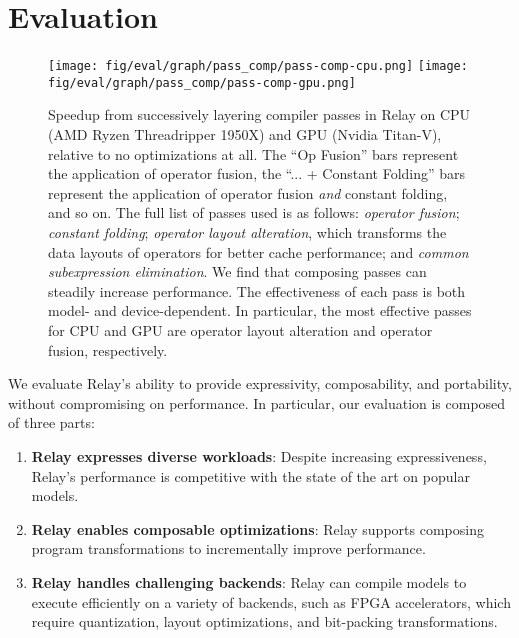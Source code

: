 \section{Evaluation}
\label{sec:eval}

\begin{figure*}[htp!]
  \centering
  \texttt{[image: fig/eval/graph/pass\_comp/pass-comp-cpu.png]}
  \texttt{[image: fig/eval/graph/pass\_comp/pass-comp-gpu.png]}
  \caption{\textmd{
    Speedup from successively layering compiler passes in Relay on CPU
    (AMD Ryzen Threadripper 1950X) and GPU (Nvidia Titan-V),
      relative to no optimizations at all.
    The ``Op Fusion'' bars represent the application of operator fusion,
      the ``... + Constant Folding'' bars represent the application of operator fusion \textit{and} constant folding,
      and so on.
    The full list of passes used is as follows:
      \textit{operator fusion};
      \textit{constant folding};
      \textit{operator layout alteration}, which transforms the data layouts of operators for better cache performance;
      and \textit{common subexpression elimination}.
    We find that composing passes can steadily increase performance.
    The effectiveness of each pass is both model- and device-dependent.
    In particular,
      the most effective passes for CPU and GPU are operator layout alteration and operator fusion,
      respectively.
  }}
  \label{fig:composability-eval}
\end{figure*}

We evaluate Relay's ability to provide expressivity, composability, and portability,
  without compromising on performance.
In particular, our evaluation is composed of three parts:
\begin{enumerate}
  \item \textbf{Relay expresses diverse workloads}: Despite increasing
    expressiveness, Relay's performance is competitive with the
    state of the art on popular models.
  \item \textbf{Relay enables composable optimizations}: Relay
    supports composing program transformations to incrementally improve performance.
  \item \textbf{Relay handles challenging backends}: Relay can compile
    models to execute efficiently on a variety of
    backends, such as FPGA accelerators, which require quantization, layout
    optimizations, and bit-packing transformations.
\end{enumerate}

